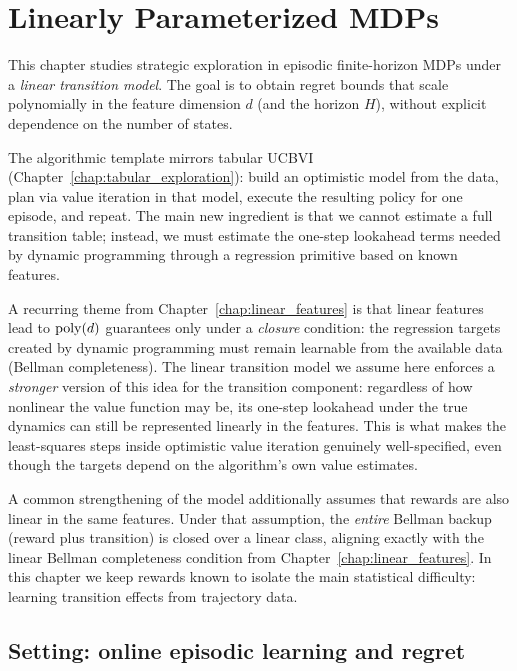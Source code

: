 \chapter{Linearly Parameterized MDPs}
\label{chap:linear_MDPs}

This chapter studies strategic exploration in episodic finite-horizon MDPs under a
\emph{linear transition model}. The goal is to obtain regret bounds that scale
polynomially in the feature dimension $d$ (and the horizon $H$), without explicit
dependence on the number of states.

The algorithmic template mirrors tabular UCBVI (Chapter~\ref{chap:tabular_exploration}):
build an optimistic model from the data, plan via value iteration in that model,
execute the resulting policy for one episode, and repeat. The main new ingredient is
that we cannot estimate a full transition table; instead, we must estimate the
one-step lookahead terms needed by dynamic programming through a regression primitive
based on known features.


A recurring theme from Chapter~\ref{chap:linear_features} is that linear features lead to
$\mathrm{poly}(d)$ guarantees only under a \emph{closure} condition: the regression targets created by
dynamic programming must remain learnable from the available data (Bellman completeness).
The linear transition model we assume here enforces a \emph{stronger} version of this idea for
the transition component: regardless of how nonlinear the value function may be, its one-step
lookahead under the true dynamics can still be represented linearly in the features. This is
what makes the least-squares steps inside optimistic value iteration genuinely well-specified,
even though the targets depend on the algorithm's own value estimates.

A common strengthening of the model additionally assumes that rewards are also linear in the
same features. Under that assumption, the \emph{entire} Bellman backup (reward plus transition)
is closed over a linear class, aligning exactly with the linear Bellman completeness condition
from Chapter~\ref{chap:linear_features}. In this chapter we keep rewards known to isolate the
main statistical difficulty: learning transition effects from trajectory data.

\section{Setting: online episodic learning and regret}
\label{sec:linear_mdp_setting}

